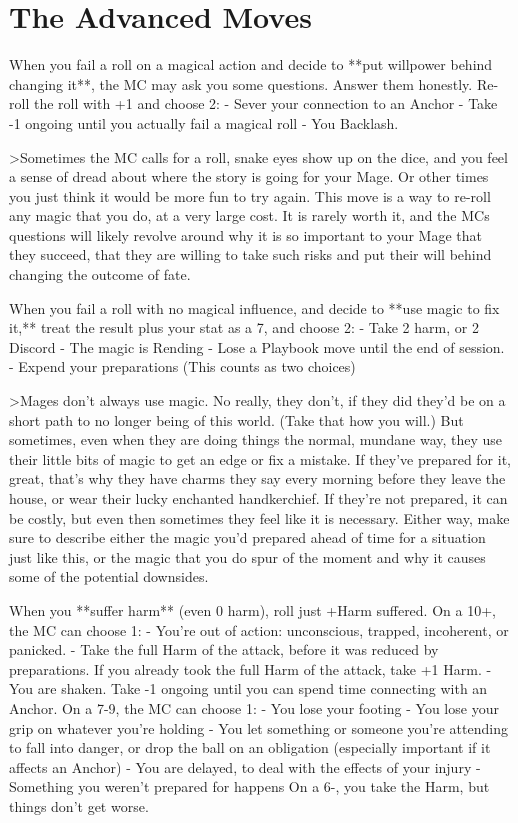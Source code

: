 \documentclass[
  oneside,
  statementpaper,
  9pt]{memoir}
\begin{document}
\hypertarget{the-advanced-moves}{%
\section{The Advanced Moves}\label{the-advanced-moves}}

\begin{Player}

When you fail a roll on a magical action and decide to **put willpower behind changing it**, the MC may ask you some questions. Answer them honestly. Re-roll the roll with +1 and choose 2:
- Sever your connection to an Anchor
- Take -1 ongoing until you actually fail a magical roll
- You Backlash.

>Sometimes the MC calls for a roll, snake eyes show up on the dice, and you feel a sense of dread about where the story is going for your Mage. Or other times you just think it would be more fun to try again. This move is a way to re-roll any magic that you do, at a very large cost. It is rarely worth it, and the MCs questions will likely revolve around why it is so important to your Mage that they succeed, that they are willing to take such risks and put their will behind changing the outcome of fate.

When you fail a roll with no magical influence, and decide to **use magic to fix it,** treat the result plus your stat as a 7, and choose 2:
- Take 2 harm, or 2 Discord
- The magic is Rending
- Lose a Playbook move until the end of session.
- Expend your preparations (This counts as two choices)

>Mages don’t always use magic. No really, they don’t, if they did they’d be on a short path to no longer being of this world. (Take that how you will.) But sometimes, even when they are doing things the normal, mundane way, they use their little bits of magic to get an edge or fix a mistake. If they’ve prepared for it, great, that’s why they have charms they say every morning before they leave the house, or wear their lucky enchanted handkerchief. If they’re not prepared, it can be costly, but even then sometimes they feel like it is necessary. Either way, make sure to describe either the magic you’d prepared ahead of time for a situation just like this, or the magic that you do spur of the moment and why it causes some of the potential downsides.

When you **suffer harm** (even 0 harm), roll just +Harm suffered. On a 10+, the MC can choose 1:
- You’re out of action: unconscious, trapped, incoherent, or panicked.
- Take the full Harm of the attack, before it was reduced by preparations. If you already took the full Harm of the attack, take +1 Harm.
- You are shaken. Take -1 ongoing until you can spend time connecting with an Anchor. 
On a 7-9, the MC can choose 1:
- You lose your footing
- You lose your grip on whatever you’re holding
-  You let something or someone you’re attending to fall into danger, or drop the ball on an obligation (especially important if it affects an Anchor)
- You are delayed, to deal with the effects of your injury
- Something you weren’t prepared for happens 
On a 6-, you take the Harm, but things don’t get worse.


\end{Player}
\end{document}
